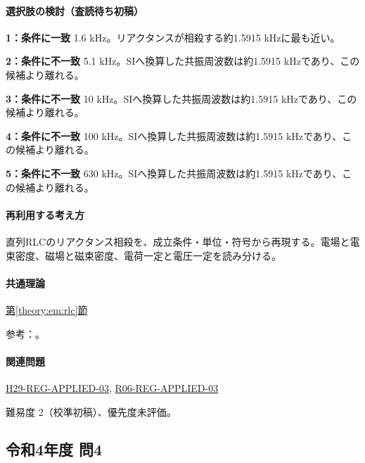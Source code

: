 \paragraph{選択肢の検討（査読待ち初稿）}\mbox{}\par

\noindent\textbf{1：条件に一致} 1.6 kHz。リアクタンスが相殺する約1.5915 kHzに最も近い。\par

\noindent\textbf{2：条件に不一致} 5.1 kHz。SIへ換算した共振周波数は約1.5915 kHzであり、この候補より離れる。\par

\noindent\textbf{3：条件に不一致} 10 kHz。SIへ換算した共振周波数は約1.5915 kHzであり、この候補より離れる。\par

\noindent\textbf{4：条件に不一致} 100 kHz。SIへ換算した共振周波数は約1.5915 kHzであり、この候補より離れる。\par

\noindent\textbf{5：条件に不一致} 630 kHz。SIへ換算した共振周波数は約1.5915 kHzであり、この候補より離れる。\par

\paragraph{再利用する考え方} 直列RLCのリアクタンス相殺を、成立条件・単位・符号から再現する。電場と電束密度、磁場と磁束密度、電荷一定と電圧一定を読み分ける。

\paragraph{共通理論} \hyperref[theory:em:rlc]{第\ref*{theory:em:rlc}節}

\par 参考：\cite{mit_em12}。

\paragraph{関連問題} \hyperref[q:h29-reg-applied-03]{H29-REG-APPLIED-03}, \hyperref[q:r06-reg-applied-03]{R06-REG-APPLIED-03}

\par 難易度 2（校準初稿）、優先度未評価。

\subsection{令和4年度 問4}
\label{q:r04-reg-applied-04}

